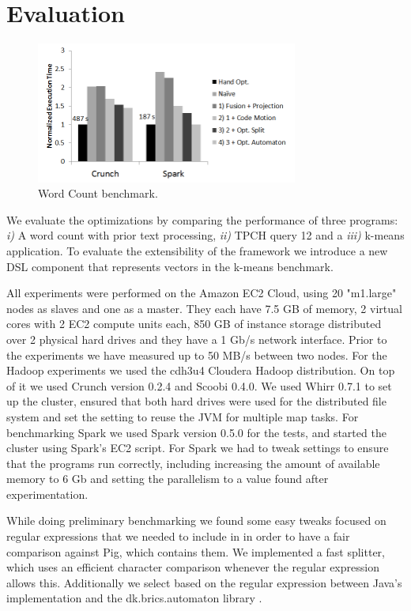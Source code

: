 \section{Evaluation}
\label{sec:evaluation}
\begin{figure}[t]
    \includegraphics[width=8.6cm]{figures/word-count.png}
   \caption{Word Count benchmark.}
   \label{fig:word-count}%
\end{figure}
We evaluate the optimizations by comparing the performance of three
programs:
\emph{i)} A word count with prior text processing, \emph{ii)} TPCH \cite{tpch}
query 12 and a  \emph{iii)} k-means application. To evaluate the extensibility
of the framework we introduce a new DSL component that represents vectors in the
k-means benchmark.

All experiments were performed on the Amazon EC2 Cloud, using 20 "m1.large"
nodes as slaves and one as a master. They each have 7.5 GB of memory, 2 virtual
cores with 2 EC2 compute units each, 850 GB of instance storage distributed over
2 physical hard drives and they have a 1 Gb/s network interface. Prior to the
experiments we have measured up to 50 MB/s between two nodes. For the Hadoop
experiments we used the cdh3u4 Cloudera Hadoop distribution. On top of it we
used Crunch version 0.2.4 and Scoobi 0.4.0. We used Whirr 0.7.1 \cite{whirr} to
set up the cluster, ensured that both hard drives were used for the
distributed file system and set the setting to reuse the JVM for
multiple map tasks.
For benchmarking Spark we used Spark version 0.5.0 for the tests, and
started the cluster using Spark's EC2 script.
For Spark we had to tweak settings to ensure that the programs run
correctly, including increasing the amount of available memory to 6 Gb and
setting the parallelism to a value found after experimentation.

While doing preliminary benchmarking we found some easy tweaks focused on
regular expressions that we needed to include in \tool in order to have a fair
comparison against Pig, which contains them. We implemented a fast splitter,
which uses an efficient character comparison whenever the regular expression
allows this. Additionally we select based on the regular expression between
Java's implementation and the dk.brics.automaton library \cite{mollerdk}.

